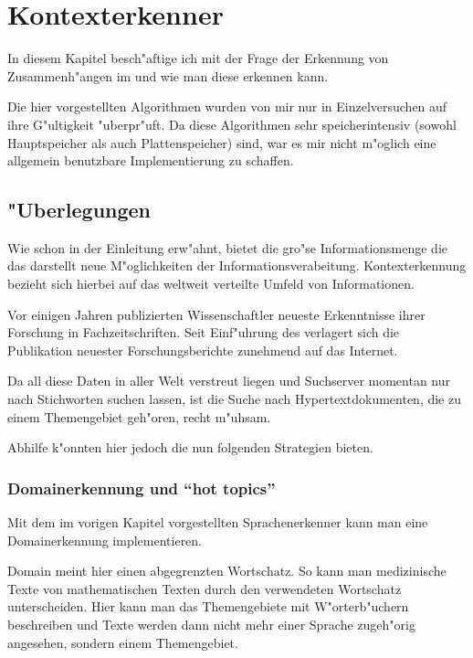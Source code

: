 
\chapter{Kontexterkenner}

In diesem Kapitel besch"aftige ich mit der Frage der Erkennung von Zusammenh"angen im \www und wie man diese erkennen kann.

Die hier vorgestellten Algorithmen wurden von mir nur in Einzelversuchen auf ihre G"ultigkeit "uberpr"uft. Da diese Algorithmen sehr speicherintensiv (sowohl Hauptspeicher als auch Plattenspeicher) sind, war es mir nicht m"oglich eine allgemein benutzbare Implementierung zu schaffen.


\section{"Uberlegungen}

Wie schon in der Einleitung erw"ahnt, bietet die gro"se Informationsmenge die das \www darstellt neue M"oglichkeiten der Informationsverabeitung. Kontexterkennung bezieht sich hierbei auf das weltweit verteilte Umfeld von Informationen.

Vor einigen Jahren publizierten Wissenschaftler neueste Erkenntnisse ihrer Forschung in Fachzeitschriften. Seit Einf"uhrung des \www verlagert sich die Publikation neuester Forschungsberichte zunehmend auf das Internet.

Da all diese Daten in aller Welt verstreut liegen und Suchserver momentan nur nach Stichworten suchen lassen, ist die Suche nach Hypertextdokumenten, die zu einem Themengebiet geh"oren, recht m"uhsam.

Abhilfe k"onnten hier jedoch die nun folgenden Strategien bieten.



\subsection{Domainerkennung und "`hot topics"'}

Mit dem im vorigen Kapitel vorgestellten Sprachenerkenner kann man eine Domainerkennung implementieren. 

Domain meint hier einen abgegrenzten Wortschatz. So kann man medizinische Texte von mathematischen Texten durch den verwendeten Wortschatz unterscheiden. Hier kann man das Themengebiete mit W"orterb"uchern beschreiben und Texte werden dann nicht mehr einer Sprache zugeh"orig angesehen, sondern einem Themengebiet.

